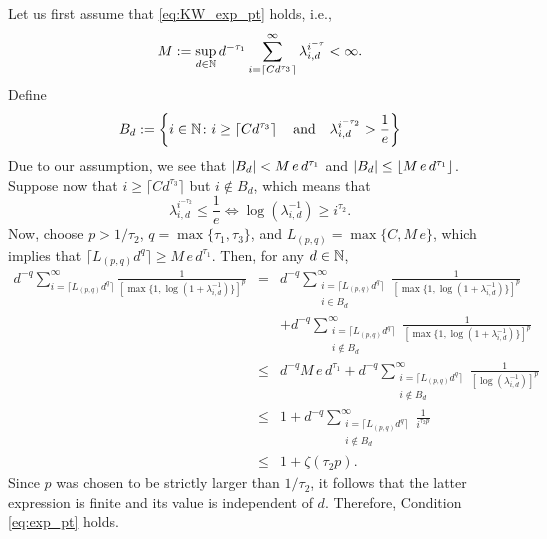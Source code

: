 \documentclass[sort&compress]{elsarticle}
\begin{document}
{Let us first assume that \eqref{eq:KW_exp_pt} holds, i.e.,
\[
M:=\sup_{d\in\mathbb{N}} d^{-\tau_1} \sum_{i=\lceil C d^{\tau_3} \rceil}^{\infty} \lambda_{i,d}^{i^{-\tau}} < \infty. 
\]
Define
\[
B_d:=\left\{i\in\mathbb{N} \colon i\ge \left\lceil Cd^{\tau_3}\right\rceil\quad\mbox{and}\quad 
\lambda_{i,d}^{i^{-\tau_2}}>\frac{1}{e}\right\}
\]
Due to our assumption, we see that $\left \lvert B_d \right \rvert < M\,e\,d^{\tau_1}$ and $\left \lvert B_d \right \rvert\le \lfloor M\,e\,d^{\tau_1} \rfloor$. Suppose now that $i\ge \lceil C d^{\tau_3}\rceil$ but $i\not\in B_d$, which means that 
\[\lambda_{i,d}^{i^{-\tau_2}} \le \frac{1}{e} \Leftrightarrow \log (\lambda_{i,d}^{-1})\ge i^{\tau_2}.\]
Now, choose $p> 1/\tau_2$, $q=\max\{\tau_1,\tau_3\}$, and $L_{(p,q)}=\max\{C, M\, e\}$, which implies that $\lceil L_{(p,q)} d^{q}\rceil \ge M\, e\, d^{\tau_1}$. Then, for any $d\in\mathbb{N}$, 
\begin{eqnarray*}
d^{-q} \sum_{i=\lceil L_{(p,q)} d^{q}\rceil}^\infty \frac{1}{[\max\{1,\log(1+\lambda_{i,d}^{-1})\}]^p}&=&d^{-q} \sum_{\substack{i=\lceil L_{(p,q)} d^{q}\rceil\\ i\in B_d}}^\infty \frac{1}{[\max\{1,\log(1+\lambda_{i,d}^{-1})\}]^p}\\
&& + d^{-q} \sum_{\substack{i=\lceil L_{(p,q)} d^{q}\rceil\\ i\not\in B_d}}^\infty \frac{1}{[\max\{1,\log(1+\lambda_{i,d}^{-1})\}]^p}\\
&\le& d^{-q} M\, e\, d^{\tau_1} + d^{-q}\sum_{\substack{i=\lceil L_{(p,q)} d^{q}\rceil\\ i\not\in B_d}}^\infty \frac{1}{[\log (\lambda_{i,d}^{-1})]^p}\\
&\le& 1 + d^{-q}\sum_{\substack{i=\lceil L_{(p,q)} d^{q}\rceil\\ i\not\in B_d}}^\infty \frac{1}{i^{\tau_2 p}}\\
&\le & 1 + \zeta (\tau_2 p).
\end{eqnarray*}
Since $p$ was chosen to be strictly larger than $1/\tau_2$, it follows that the latter expression is finite and its value is independent of $d$. Therefore, Condition \eqref{eq:exp_pt} holds.

}
\end{document}
